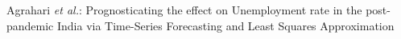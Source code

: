 \documentclass[10pt,journal,compsoc]{IEEEtran}
\begin{document}
%
{Agrahari \MakeLowercase{\textit{et al.}}: Prognosticating the effect on Unemployment rate in the post-pandemic India via Time-Series Forecasting and Least Squares Approximation}
% 






\end{document}
